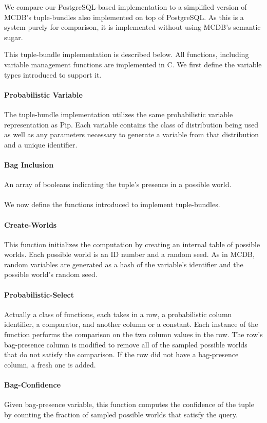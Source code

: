 
We compare our PostgreSQL-based implementation to a simplified version of MCDB's tuple-bundles also implemented on top of PostgreSQL.  As this is a system purely for comparison, it is implemented without using MCDB's semantic sugar.  

This tuple-bundle implementation is described below.  All functions, including variable management functions are implemented in C.  We first define the variable types introduced to support it.

\paragraph{Probabilistic Variable} The tuple-bundle implementation utilizes the same probabilistic variable representation as Pip.  Each variable contains the class of distribution being used as well as any parameters necessary to generate a variable from that distribution and a unique identifier.  

\paragraph{Bag Inclusion} An array of booleans indicating the tuple's presence in a possible world.
\\
\\
We now define the functions introduced to implement tuple-bundles.

\paragraph{Create-Worlds} This function initializes the computation by creating an internal table of possible worlds.  Each possible world is an ID number and a random seed.  As in MCDB, random variables are generated as a hash of the variable's identifier and the possible world's random seed.

\paragraph{Probabilistic-Select} Actually a class of functions, each takes in a row, a probabilistic column identifier, a comparator, and another column or a constant.  Each instance of the function performs the comparison on the two column values in the row.  The row's bag-presence column is modified to remove all of the sampled possible worlds that do not satisfy the comparison.  If the row did not have a bag-presence column, a fresh one is added.

\paragraph{Bag-Confidence} Given bag-presence variable, this function computes the confidence of the tuple by counting the fraction of sampled possible worlds that satisfy the query.
